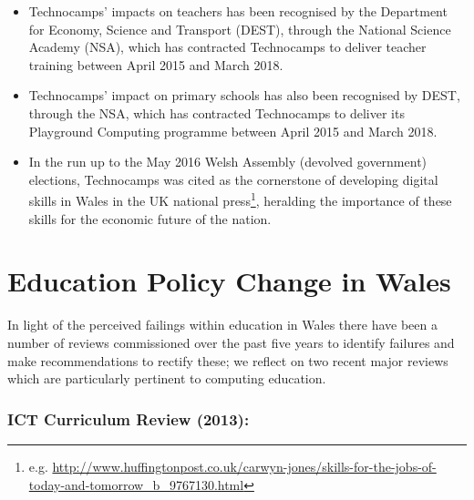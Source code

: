 \documentclass{llncs}
\begin{document}
\begin{itemize}
\item Technocamps' impacts on teachers has been recognised by
the Department for Economy, Science and Transport (DEST), through the
National Science Academy (NSA), which has contracted Technocamps to deliver
teacher training between April 2015 and March 2018.

\item Technocamps' impact on primary schools has also been
recognised by DEST, through the NSA, which has contracted
Technocamps to deliver its Playground Computing programme between
April 2015 and March 2018.

\item In the run up to the May 2016 Welsh Assembly (devolved
government) elections, Technocamps was cited as the cornerstone of
developing digital skills in Wales in the UK national
press\footnote{e.g. \url{http://www.huffingtonpost.co.uk/carwyn-jones/skills-for-the-jobs-of-today-and-tomorrow_b_9767130.html}},
heralding the importance of these skills for the economic future of
the nation.
 
\end{itemize}

\section{Education Policy Change in Wales}\label{welshedurefom}

In light of the perceived failings within education in Wales there
have been a number of reviews commissioned over the past five years
to identify failures and make recommendations to rectify these;
we reflect on two recent major reviews which are particularly pertinent
to computing education.

\subsubsection*{ICT Curriculum Review (2013):}



\end{document}
